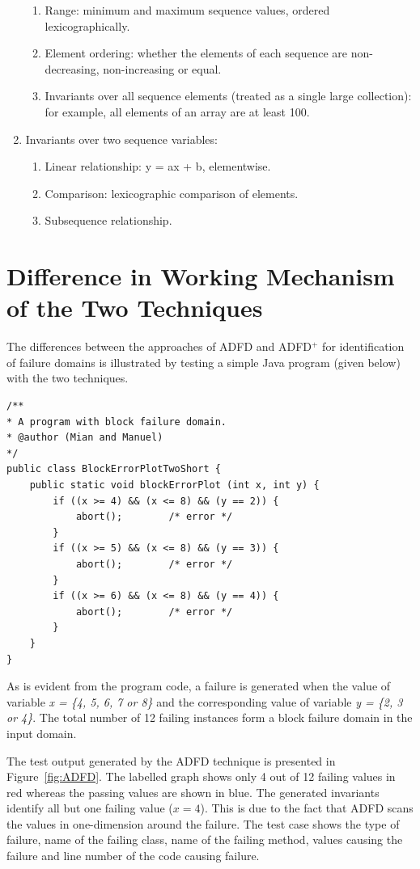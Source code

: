 \begin{enumerate}
\begin{enumerate}
	\item Range: minimum and maximum sequence values, ordered lexicographically. 
	\item Element ordering: whether the elements of each sequence are non-decreasing, non-increasing or equal.
	\item Invariants over all sequence elements (treated as a single large collection): for example, all elements of an array are at least 100.
	\end{enumerate}
\item Invariants over two sequence variables: 
	\begin{enumerate}
	\item Linear relationship: y = ax + b, elementwise. 
	\item Comparison: lexicographic comparison of elements. 
	\item Subsequence relationship.
	\end{enumerate}
\end{enumerate}








\section{Difference in Working Mechanism of the Two Techniques}
The differences between the approaches of ADFD and ADFD$^+$ for identification of failure domains is illustrated by testing a simple Java program (given below) with the two techniques. 
\bigskip
\begin{lstlisting}
/** 
* A program with block failure domain.
* @author (Mian and Manuel)
*/
public class BlockErrorPlotTwoShort {
	public static void blockErrorPlot (int x, int y) {
		if ((x >= 4) && (x <= 8) && (y == 2)) { 
			abort();		/* error */
		}
		if ((x >= 5) && (x <= 8) && (y == 3)) { 
			abort();		/* error */
		}
		if ((x >= 6) && (x <= 8) && (y == 4)) { 
			abort();		/* error */
		}
	}
}
\end{lstlisting}
\bigskip


As is evident from the program code, a failure is generated when the value of variable \textit{x = \{4, 5, 6, 7 or 8\}} and the corresponding value of variable \textit{y = \{2, 3 or 4\}}. The total number of 12 failing instances form a block failure domain in the input domain.

The test output generated by the ADFD technique is presented in Figure~\ref{fig:ADFD}. The labelled graph shows only 4 out of 12 failing values in red whereas the passing values are shown in blue. The generated invariants identify all but one failing value ($x = 4$). This is due to the fact that ADFD scans the values in one-dimension around the failure. The test case shows the type of failure, name of the failing class, name of the failing method, values causing the failure and line number of the code causing failure.

